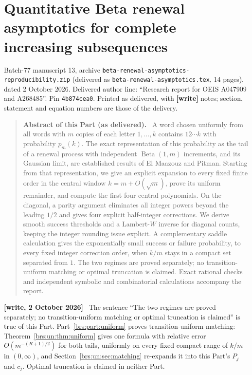 \documentclass[11pt]{article}
\newcommand{\parthead}{Front matter}
\numberwithin{equation}{section}
\theoremstyle{remark}\newtheorem{remark}[theorem]{Remark}
\newcommand{\file}[1]{\nolinkurl{#1}}
\newenvironment{writenote}{\par\smallskip\begingroup\small\noindent\textbf{[write, 2 October 2026]}\ }{\par\endgroup\smallskip}
\newenvironment{partabstract}{\begin{quote}\small\noindent\textbf{Abstract of this Part (as delivered).}\ }{\end{quote}}
\newcommand{\partsource}[1]{\par\noindent\begin{minipage}{\textwidth}\small #1\end{minipage}\par\medskip}
\begin{document}
\clearpage
\renewcommand{\parthead}{Part I: central and separated regimes}
\part{Quantitative Beta renewal asymptotics for complete increasing subsequences}\label{brs:part:central}
\partsource{Batch-77 manuscript 13, archive \file{beta-renewal-asymptotics-reproducibility.zip} (delivered as \file{beta-renewal-asymptotics.tex}, 14 pages), dated 2 October 2026. Delivered author line: ``Research report for OEIS A047909 and A268485''. Pin \texttt{4b874cea0}. Printed as delivered, with \textbf{[write]} notes; section, statement and equation numbers are those of the delivery.}
\begin{partabstract}
A word chosen uniformly from all words with $m$ copies of each letter
$1,\ldots,k$ contains $12\cdots k$ with probability $p_m(k)$.  The exact
representation of this probability as the tail of a renewal process with
independent $\operatorname{Beta}(1,m)$ increments, and its Gaussian limit,
are established results of El Maazouz and Pitman.  Starting from that
representation, we give an explicit expansion to every fixed finite order
in the central window $k=m+O(\sqrt m)$, prove its uniform remainder, and
compute the first four central polynomials.  On the diagonal, a parity
argument eliminates all integer powers beyond the leading $1/2$ and gives
four explicit half-integer corrections.  We derive smooth success
thresholds and a Lambert-$W$ inverse for diagonal counts, keeping the
integer rounding issue explicit.  A complementary saddle calculation
gives the exponentially small success or failure probability, to every
fixed integer correction order, when $k/m$ stays in a compact set separated
from $1$.  The two regimes are proved separately; no transition-uniform
matching or optimal truncation is claimed.  Exact rational checks and
independent symbolic and combinatorial calculations accompany the report.
\end{partabstract}
\begin{writenote}
The sentence ``The two regimes are proved separately; no transition-uniform matching or optimal truncation is claimed'' is true of this Part. Part~\ref{brs:part:uniform} proves transition-uniform matching: Theorem~\ref{brs:un:thm:uniform} gives one formula with relative error $O(m^{-(R+1)/2})$ for both tails, uniformly on every fixed compact range of $k/m$ in $(0,\infty)$, and Section~\ref{brs:un:sec:matching} re-expands it into this Part's $P_j$ and $c_j$. Optimal truncation is claimed in neither Part.
\end{writenote}
\end{document}
